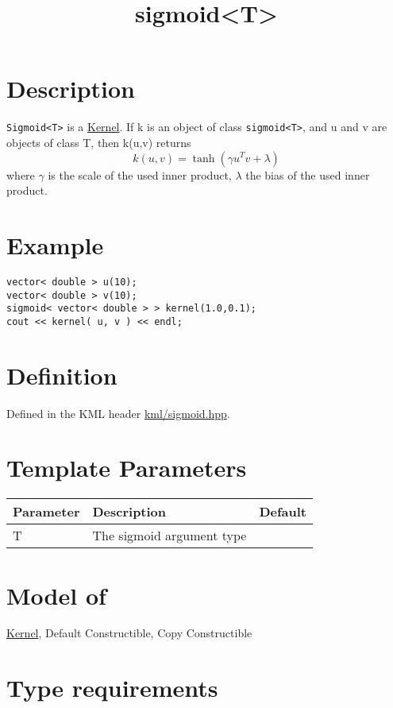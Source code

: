 \documentclass{article}
\begin{document}
\title{sigmoid<T>}
\maketitle

\section*{Description}

\texttt{Sigmoid<T>} is a \href{\kmlroot/kernel.html}{Kernel}. If k is an object of class \texttt{sigmoid<T>}, and u and v are objects of class T, then k(u,v) returns
%
$$k(u,v) = \tanh( \gamma u^T v + \lambda)$$
%
where $\gamma$ is the scale of the used inner product, $\lambda$ the bias of the used inner product. 


\section*{Example}


\highlightcpp{}
\begin{verbatim}
vector< double > u(10);
vector< double > v(10);
sigmoid< vector< double > > kernel(1.0,0.1);
cout << kernel( u, v ) << endl;
\end{verbatim}


\section*{Definition}

Defined in the KML header \href{\kmlroot/sigmoid.hpp}{kml/sigmoid.hpp}.


\section*{Template Parameters}

\begin{tabular}{lll}
\textbf{Parameter} & \textbf{Description} & \textbf{Default} \\ 
\hline
T & The sigmoid argument type \\ 
\end{tabular}


\section*{Model of}

\href{\kmlroot/kernel.html}{Kernel},
Default Constructible, Copy Constructible


\section*{Type requirements}
\end{document}
